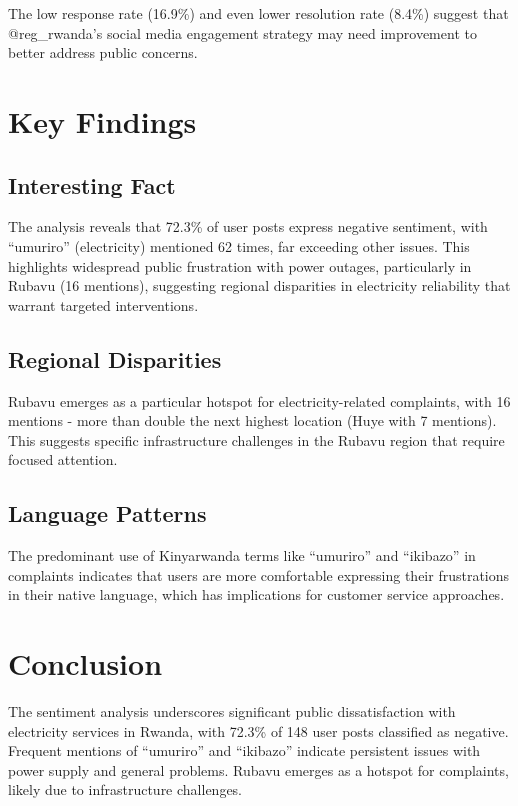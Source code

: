 \documentclass[a4paper,12pt]{article}
\begin{document}
	The low response rate (16.9\%) and even lower resolution rate (8.4\%) suggest that @reg\_rwanda's social media engagement strategy may need improvement to better address public concerns.
	
	\section{Key Findings}
	
	\subsection{Interesting Fact}
	The analysis reveals that 72.3\% of user posts express negative sentiment, with ``umuriro'' (electricity) mentioned 62 times, far exceeding other issues. This highlights widespread public frustration with power outages, particularly in Rubavu (16 mentions), suggesting regional disparities in electricity reliability that warrant targeted interventions.
	
	\subsection{Regional Disparities}
	Rubavu emerges as a particular hotspot for electricity-related complaints, with 16 mentions - more than double the next highest location (Huye with 7 mentions). This suggests specific infrastructure challenges in the Rubavu region that require focused attention.
	
	\subsection{Language Patterns}
	The predominant use of Kinyarwanda terms like ``umuriro'' and ``ikibazo'' in complaints indicates that users are more comfortable expressing their frustrations in their native language, which has implications for customer service approaches.
	
	\section{Conclusion}
	The sentiment analysis underscores significant public dissatisfaction with electricity services in Rwanda, with 72.3\% of 148 user posts classified as negative. Frequent mentions of ``umuriro'' and ``ikibazo'' indicate persistent issues with power supply and general problems. Rubavu emerges as a hotspot for complaints, likely due to infrastructure challenges. 
	
\end{document}
